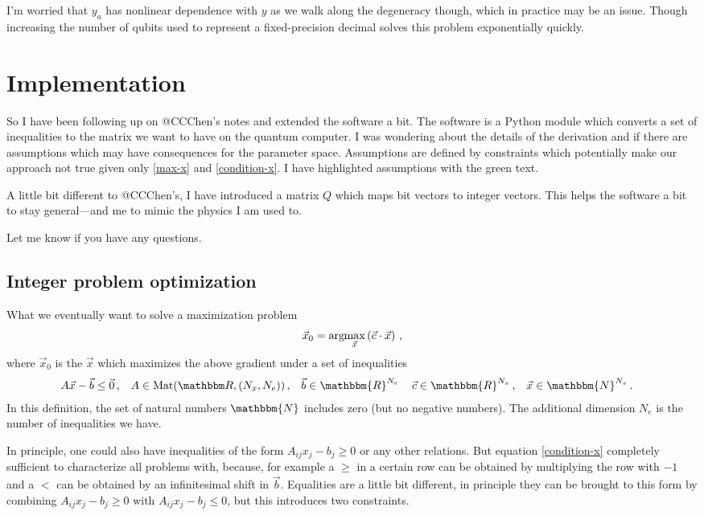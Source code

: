 \documentclass[]{article}
\newcommand{\argmax}[1]{\text{arg}\hspace{-2pt}\max\limits_{#1}}
\newcommand{\assumption}[1]{{\color{red}#1}}
\begin{document}
I'm worried that $y_a$ has nonlinear dependence with $y$ as we walk along the degeneracy though, which in practice may be an issue. Though increasing the number of qubits used to represent a fixed-precision decimal solves this problem exponentially quickly.

\section{Implementation}

So I have been following up on @CCChen's notes and extended the software a bit.
The software is a Python module which converts a set of inequalities to the matrix we want to have on the quantum computer.
I was wondering about the details of the derivation and if there are assumptions which may have consequences for the parameter space.
Assumptions are defined by constraints which potentially make our approach not true given only \eqref{max-x} and \eqref{condition-x}.
I have highlighted assumptions with the \assumption{green text}.

A little bit different to @CCChen's, I have introduced a matrix $Q$ which maps bit vectors to integer vectors.
This helps the software a bit to stay general---and me to mimic the physics I am used to.

Let me know if you have any questions.

\subsection{Integer problem optimization}
What we eventually want to solve a maximization problem
\begin{equation}\label{max-x}
	\vec x_0 = \argmax{\vec x} \left( \vec c \cdot \vec x\right) \, ,
\end{equation}
where $\vec x_0$ is the $\vec x$ which maximizes the above gradient under a set of inequalities
\begin{align}\label{condition-x}
	A \vec x - \vec b &\leq \vec 0 \, , &
	A &\in \text{Mat}(\mathbbm R, (N_x, N_e)) \, , &
	\vec b &\in \mathbbm{R}^{N_e} \, &
	\vec c &\in \mathbbm{R}^{N_x} \, , &
	\vec x &\in \mathbbm{N}^{N_x}\, .
\end{align}
In this definition, the set of natural numbers $\mathbbm{N}$ includes zero (but no negative numbers).
The additional dimension $N_e$ is the number of inequalities we have.

In principle, one could also have inequalities of the form $A_{ij} x_j - b_j \geq 0$ or any other relations.
But equation \eqref{condition-x} completely sufficient to characterize all problems with, because, for example a $\geq$ in a certain row can be obtained by multiplying the row with $-1$ and a $<$ can be obtained by an infinitesimal shift in $\vec b$.
Equalities are a little bit different, in principle they can be brought to this form by combining $A_{ij} x_j - b_j \geq 0$ with $A_{ij} x_j - b_j \leq 0$, but this introduces two constraints.
\end{document}

